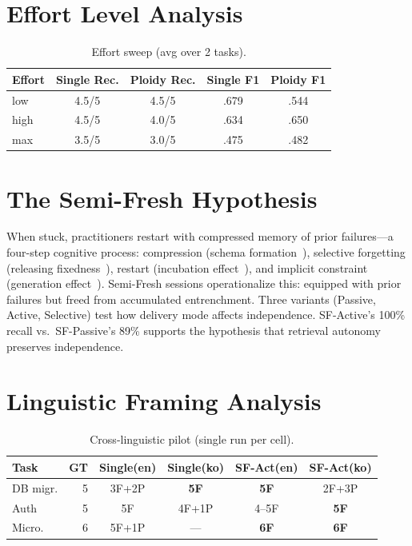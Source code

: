 \documentclass{article}
\begin{document}
\section{Effort Level Analysis}
\label{sec:effort-appendix}
\begin{table}[H]
\centering
\caption{Effort sweep (avg over 2 tasks).}
\small
\begin{tabular}{@{}lcccc@{}}
\toprule
\textbf{Effort} & \textbf{Single Rec.} & \textbf{Ploidy Rec.} & \textbf{Single F1} & \textbf{Ploidy F1} \\
\midrule
low & 4.5/5 & 4.5/5 & .679 & .544 \\
high & 4.5/5 & 4.0/5 & .634 & .650 \\
max & 3.5/5 & 3.0/5 & .475 & .482 \\
\bottomrule
\end{tabular}
\end{table}

\section{The Semi-Fresh Hypothesis}
\label{sec:semifresh-appendix}

When stuck, practitioners restart with compressed memory of prior failures---a four-step cognitive process: compression (schema formation~\citep{bartlett1932remembering}), selective forgetting (releasing fixedness~\citep{storm2012forgetting}), restart (incubation effect~\citep{sio2009incubation}), and implicit constraint (generation effect~\citep{slamecka1978generation}). Semi-Fresh sessions operationalize this: equipped with prior failures but freed from accumulated entrenchment. Three variants (Passive, Active, Selective) test how delivery mode affects independence. SF-Active's 100\% recall vs.\ SF-Passive's 89\% supports the hypothesis that retrieval autonomy preserves independence.

\section{Linguistic Framing Analysis}
\label{sec:language-appendix}

\begin{table}[H]
\centering
\caption{Cross-linguistic pilot (single run per cell).}
\small
\begin{tabular}{@{}lr cccc@{}}
\toprule
\textbf{Task} & \textbf{GT} & \textbf{Single(en)} & \textbf{Single(ko)} & \textbf{SF-Act(en)} & \textbf{SF-Act(ko)} \\
\midrule
DB migr. & 5 & 3F+2P & \textbf{5F} & \textbf{5F} & 2F+3P \\
Auth & 5 & 5F & 4F+1P & 4--5F & \textbf{5F} \\
Micro. & 6 & 5F+1P & --- & \textbf{6F} & \textbf{6F} \\
\bottomrule
\end{tabular}
\end{table}
\end{document}
